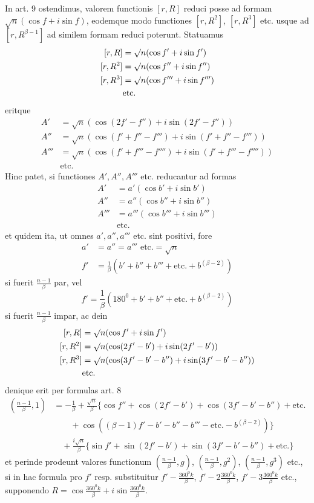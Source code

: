 In art. 9 ostendimus, valorem functionis $[r,R]$ reduci posse ad formam $\surd n(\cos f+i\sin f)$, eodemque modo functiones $[r,R^2]$, $[r,R^3]$ etc. usque ad $[r,R^{\beta-1}]$ ad similem formam reduci poterunt. Statuamus
\[
\begin{aligned}
[r,R]&=\surd n(\cos f'+i\sin f')\\
\relax[r,R^2]&=\surd n(\cos f''+i\sin f'')\\
\relax[r,R^3]&=\surd n(\cos f'''+i\sin f''')\\
&\text{etc.}
\end{aligned}
\]
eritque
\[
\begin{aligned}
A'&=\surd n(\cos(2f'-f'')+i\sin(2f'-f''))\\
A''&=\surd n(\cos(f'+f''-f''')+i\sin(f'+f''-f'''))\\
A'''&=\surd n(\cos(f'+f'''-f'''')+i\sin(f'+f'''-f''''))\\
&\text{etc.}
\end{aligned}
\]
Hinc patet, si functiones $A',A'',A'''$ etc. reducantur ad formas
\[
\begin{aligned}
A'&=a'(\cos b'+i\sin b')\\
A''&=a''(\cos b''+i\sin b'')\\
A'''&=a'''(\cos b'''+i\sin b''')\\
&\text{etc.}
\end{aligned}
\]
et quidem ita, ut omnes $a',a'',a'''$ etc. sint positivi, fore
\[
\begin{aligned}
a'&=a''=a'''\text{ etc.}=\surd n\\
f'&=\frac1\beta(b'+b''+b'''+\text{etc.}+b^{(\beta-2)})
\end{aligned}
\]
si fuerit $\frac{n-1}\beta$ par, vel
\[
f'=\frac1\beta(180^0+b'+b''+\text{etc.}+b^{(\beta-2)})
\]
si fuerit $\frac{n-1}\beta$ impar, ac dein
\[
\begin{aligned}
[r,R]&=\surd n(\cos f'+i\sin f')\\
\relax[r,R^2]&=\surd n(\cos(2f'-b')+i\sin(2f'-b'))\\
\relax[r,R^3]&=\surd n(\cos(3f'-b'-b'')+i\sin(3f'-b'-b''))\\
&\text{etc.}
\end{aligned}
\]
%
denique erit per formulas art. 8
\[
\begin{aligned}
\left(\frac{n-1}\beta,1\right)&=-\frac1\beta+\frac{\surd n}\beta\{\cos f''+\cos(2f'-b')+\cos(3f'-b'-b'')+\text{etc.}\\
&\qquad+\cos((\beta-1)f'-b'-b''-b'''-\text{etc.}-b^{(\beta-2)})\}\\
&\quad+\frac{i\surd n}\beta\{\sin f'+\sin(2f'-b')+\sin(3f'-b'-b'')+\text{etc.}\}
\end{aligned}
\]
et perinde prodeunt valores functionum $\left(\frac{n-1}\beta,g\right)$, $\left(\frac{n-1}\beta,g^2\right)$, $\left(\frac{n-1}\beta,g^3\right)$ etc., si in hac formula pro $f'$ resp. substituitur $f'-\frac{360^0k}\beta$, $f'-2\frac{360^0k}\beta$, $f'-3\frac{360^0k}\beta$ etc., supponendo $R=\cos\frac{360^0k}\beta+i\sin\frac{360^0k}\beta$.

